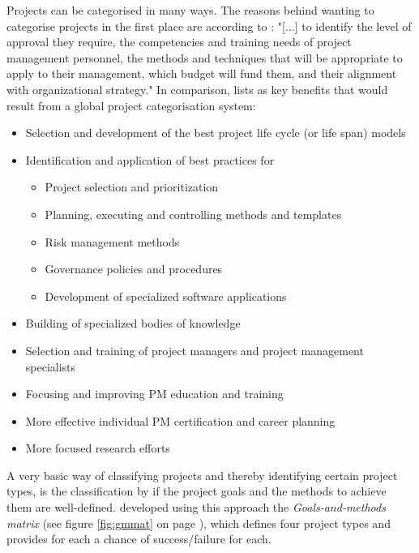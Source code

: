 Projects can be categorised in many ways. The reasons behind wanting to categorise projects in the first place are according to : "[...] to identify the level of approval they require, the competencies and training needs of project management personnel, the methods and techniques that will be appropriate to apply to their management, which budget will fund them, and their alignment with organizational strategy." In comparison,  lists as key benefits that would result from a global project categorisation system:
\begin{itemize}[noitemsep]
    \item Selection and development of the best project life cycle (or life span) models 
    \item Identification and application of best practices for 
        \begin{itemize}
            \item Project selection and prioritization
            \item Planning, executing and controlling methods and templates
            \item Risk management methods
            \item Governance policies and procedures
            \item Development of specialized software applications
        \end{itemize}
    \item Building of specialized bodies of knowledge
    \item Selection and training of project managers and project management specialists 
    \item Focusing and improving PM education and training
    \item More effective individual PM certification and career planning
    \item More focused research efforts 
\end{itemize}

A very basic way of classifying projects and thereby identifying certain project types, is the classification by if the project goals and the methods to achieve them are well-defined.  developed using this approach the \textit{Goals-and-methods matrix} (see figure \ref{fig:gmmat} on page \pageref{fig:gmmat}), which defines four project types and provides for each a chance of success/failure for each. 


